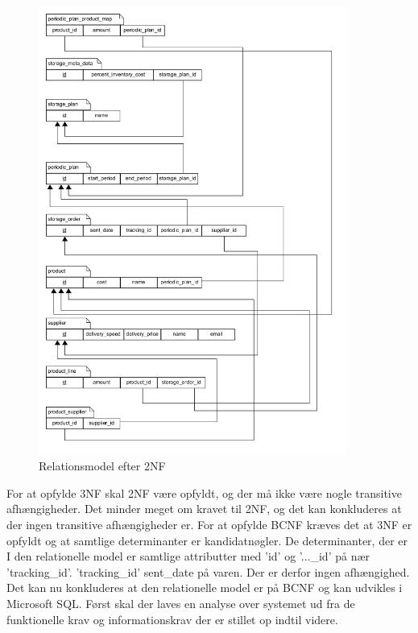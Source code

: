 \begin{figure}[H]
    \centering
    \includegraphics[width=0.9\textwidth]{figures/krav/relation_model_1th_normalization}
    \caption{Relationsmodel efter 2NF}
    \label{fig:relational_model_1}
\end{figure}

For at opfylde 3NF skal 2NF være opfyldt, og der må ikke være nogle transitive afhængigheder. Det minder meget om kravet til 2NF, og det kan konkluderes at der ingen transitive afhængigheder er.
For at opfylde BCNF kræves det at 3NF er opfyldt og at samtlige determinanter er kandidatnøgler. De determinanter, der er I den relationelle model er samtlige attributter med 'id' og '...\_id' på nær 'tracking\_id'. 'tracking\_id' sent\_date på varen. Der er derfor ingen afhængighed. 
Det kan nu konkluderes at den relationelle model er på BCNF og kan udvikles i Microsoft SQL. Først skal der laves en analyse over systemet ud fra de funktionelle krav og informationskrav der er stillet op indtil videre. 


